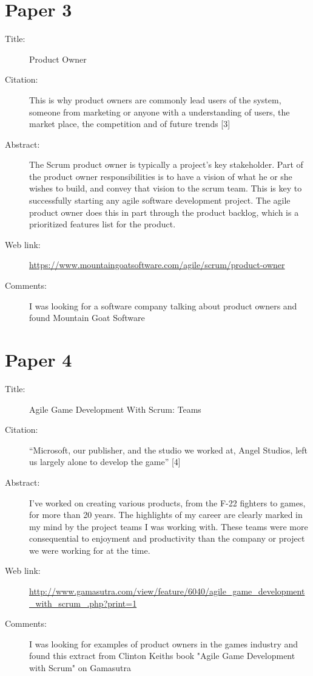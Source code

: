 \documentclass{scrartcl}
\begin{document}
\section*{Paper 3}
\begin{description}
\item[Title:] Product Owner
\item[Citation:] This is why product owners are commonly lead users of the system, someone from marketing or anyone with a understanding of users, the market place, the competition and of future trends [3]
\item[Abstract:] The Scrum product owner is typically a project's key stakeholder. Part of the product owner responsibilities is to have a vision of what he or she wishes to build, and convey that vision to the scrum team. This is key to successfully starting any agile software development project. The agile product owner does this in part through the product backlog, which is a prioritized features list for the product.
\item[Web link:]\url{https://www.mountaingoatsoftware.com/agile/scrum/product-owner}
\item[Comments:] I was looking for a software company talking about product owners and found Mountain Goat Software
\end{description}


\section*{Paper 4}
\begin{description}
\item[Title:] Agile Game Development With Scrum: Teams
\item[Citation:] “Microsoft, our publisher, and the studio we worked at, Angel Studios, left us largely alone to develop the game” [4]
\item[Abstract:] I've worked on creating various products, from the F-22 fighters to games, for more than 20 years. The highlights of my career are clearly marked in my mind by the project teams I was working with. These teams were more consequential to enjoyment and productivity than the company or project we were working for at the time.
\item[Web link:] \url{http://www.gamasutra.com/view/feature/6040/agile_game_development_with_scrum_.php?print=1}
\item[Comments:] I was looking for examples of product owners in the games industry and found this extract from Clinton Keiths book "Agile Game Development with Scrum" on Gamasutra
\end{description}
\end{document}
